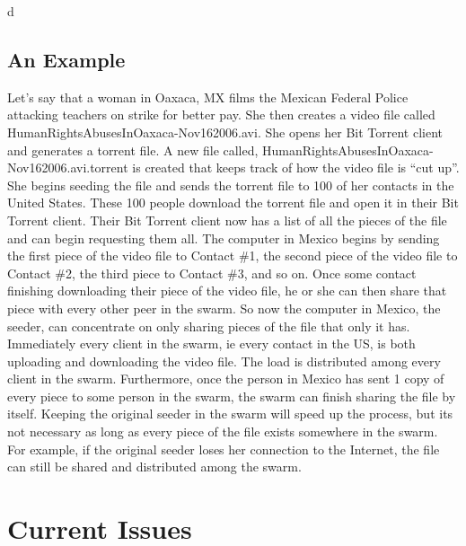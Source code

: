 d\documentclass[a4paper,12pt]{report}
\begin{document}
\section{An Example}
Let’s say that a woman in Oaxaca, MX films the Mexican Federal Police attacking teachers on strike for better pay. 
She then creates a video file called HumanRightsAbusesInOaxaca-Nov162006.avi. She opens her Bit Torrent client and generates a torrent file. 
A new file called, HumanRightsAbusesInOaxaca-Nov162006.avi.torrent is created that keeps track of how the video file is “cut up”. 
She begins seeding the file and sends the torrent file to 100 of her contacts in the United States.
These 100 people download the torrent file and open it in their Bit Torrent client. 
Their Bit Torrent client now has a list of all the pieces of the file and can begin requesting them all. 
The computer in Mexico begins by sending the first piece of the video file to Contact \#1, the second piece of the video file to Contact \#2, the third piece to Contact \#3, and so on. 
Once some contact finishing downloading their piece of the video file, he or she can then share that piece with every other peer in the swarm. 
So now the computer in Mexico, the seeder, can concentrate on only sharing pieces of the file that only it has. 
Immediately every client in the swarm, ie every contact in the US, is both uploading and downloading the video file. 
The load is distributed among every client in the swarm. 
Furthermore, once the person in Mexico has sent 1 copy of every piece to some person in the swarm, the swarm can finish sharing the file by itself. 
Keeping the original seeder in the swarm will speed up the process, but its not necessary as long as every piece of the file exists somewhere in the swarm. 
For example, if the original seeder loses her connection to the Internet, the file can still be shared and distributed among the swarm. 

\chapter{Current Issues}
\end{document}
